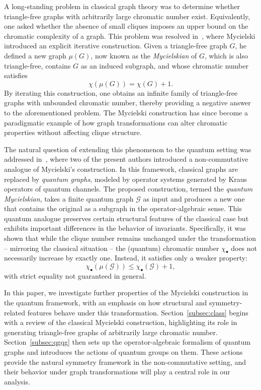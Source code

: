 \documentclass[11pt,reqno]{amsart}
\begin{document}
A long-standing problem in classical graph theory was to determine whether triangle-free graphs with arbitrarily large chromatic number exist. Equivalently, one asked whether the absence of small cliques imposes an upper bound on the chromatic complexity of a graph. This problem was resolved in~\cite{Mycielski}, where Mycielski introduced an explicit iterative construction. Given a triangle-free graph $G$, he defined a new graph $\mu(G)$, now known as the {\it Mycielskian} of $G$, which is also triangle-free, contains $G$ as an induced subgraph, and whose chromatic number satisfies 
\[
\chi(\mu(G)) = \chi(G) + 1.
\]  
By iterating this construction, one obtains an infinite family of triangle-free graphs with unbounded chromatic number, thereby providing a negative answer to the aforementioned problem. The Mycielski construction has since become a paradigmatic example of how graph transformations can alter chromatic properties without affecting clique structure.  

The natural question of extending this phenomenon to the quantum setting was addressed in~\cite{BochKaspMyc}, where two of the present authors introduced a non-commutative analogue of Mycielski's construction. In this framework, classical graphs are replaced by {\it quantum graphs}, modeled by operator systems generated by Kraus operators of quantum channels. The proposed construction, termed the {\it quantum Mycielskian}, takes a finite quantum graph $\mathcal{G}$ as input and produces a new one that contains the original as a subgraph in the operator-algebraic sense. This quantum analogue preserves certain structural features of the classical case but exhibits important differences in the behavior of invariants. Specifically, it was shown that while the clique number remains unchanged under the transformation -- mirroring the classical situation -- the (quantum) chromatic number $\chi_\bullet$ does not necessarily increase by exactly one. Instead, it satisfies only a weaker property:
\[
\chi_{\bullet}(\mu(\mathcal{G})) \leq \chi_\bullet(\mathcal{G}) + 1,
\]
with strict equality not guaranteed in general.

In this paper, we investigate further properties of the Mycielski construction in the quantum framework, with an emphasis on how structural and symmetry-related features behave under this transformation. Section~\ref{subsec:class} begins with a review of the classical Mycielski construction, highlighting its role in generating triangle-free graphs of arbitrarily large chromatic number. Section~\ref{subsec:qgqg} then sets up the operator-algebraic formalism of quantum graphs and introduces the actions of quantum groups on them. These actions provide the natural symmetry framework in the non-commutative setting, and their behavior under graph transformations will play a central role in our analysis.
\end{document}
